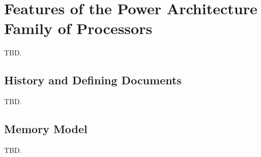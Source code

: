 \section{Features of the Power Architecture\textsuperscript{\textregistered}
         Family of Processors}
\label{sfpa0}

TBD.


\subsection{History and Defining Documents}
\label{sfpa0:shdd0}

TBD.


\subsection{Memory Model}
\label{sfpa0:smmo0}

TBD.


